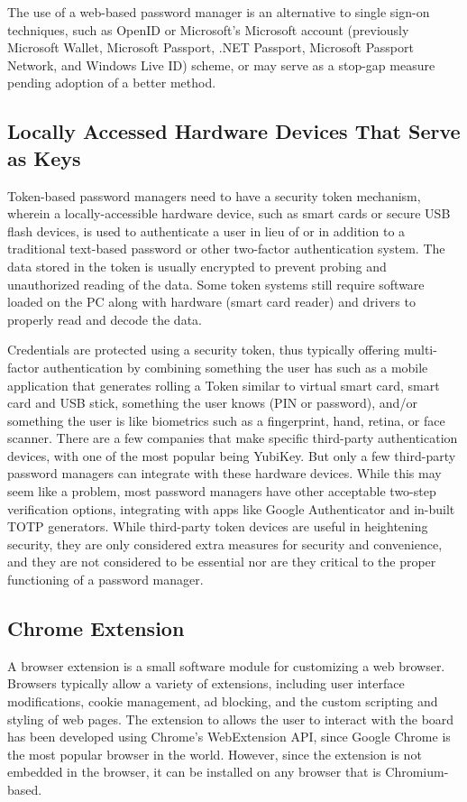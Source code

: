 The use of a web-based password manager is an alternative to single sign-on techniques, such as OpenID or Microsoft's Microsoft account (previously Microsoft Wallet, Microsoft Passport, .NET Passport, Microsoft Passport Network, and Windows Live ID) scheme, or may serve as a stop-gap measure pending adoption of a better method.

\subsection*{Locally Accessed Hardware Devices That Serve as Keys}

Token-based password managers need to have a security token mechanism, wherein a locally-accessible hardware device, such as smart cards or secure USB flash devices, is used to authenticate a user in lieu of or in addition to a traditional text-based password or other two-factor authentication system. The data stored in the token is usually encrypted to prevent probing and unauthorized reading of the data. Some token systems still require software loaded on the PC along with hardware (smart card reader) and drivers to properly read and decode the data.

Credentials are protected using a security token, thus typically offering multi-factor authentication by combining
something the user has such as a mobile application that generates rolling a Token similar to virtual smart card, smart card and USB stick,
something the user knows (PIN or password), and/or
something the user is like biometrics such as a fingerprint, hand, retina, or face scanner.
There are a few companies that make specific third-party authentication devices, with one of the most popular being YubiKey. But only a few third-party password managers can integrate with these hardware devices. While this may seem like a problem, most password managers have other acceptable two-step verification options, integrating with apps like Google Authenticator and in-built TOTP generators. While third-party token devices are useful in heightening security, they are only considered extra measures for security and convenience, and they are not considered to be essential nor are they critical to the proper functioning of a password manager.

\subsection*{Chrome Extension}

A browser extension is a small software module for customizing a web browser. Browsers typically allow a variety of extensions, including user interface modifications, cookie management, ad blocking, and the custom scripting and styling of web pages.
The extension to allows the user to interact with the board has been developed using Chrome's WebExtension API, since Google Chrome is the most popular browser in the world. However, since the extension is not embedded in the browser, it can be installed on any browser that is Chromium-based.
